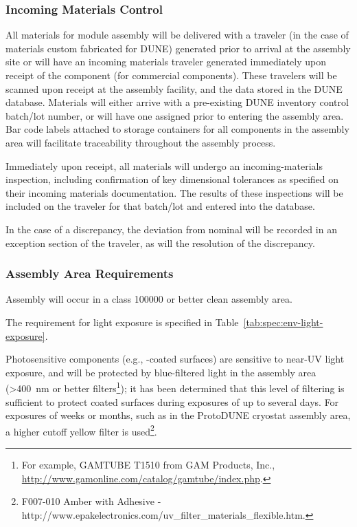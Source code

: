 \subsubsection{Incoming Materials Control}

All materials for  module assembly will be delivered with a  traveler (in the case of materials custom fabricated for DUNE) generated prior to arrival at the assembly site or will have an incoming materials traveler generated immediately upon receipt of the component (for commercial components).  These travelers will be scanned upon receipt at the assembly facility, and the data stored in the DUNE  database.  Materials will either arrive with a pre-existing DUNE inventory control batch/lot number, or will have one assigned prior to entering the assembly area.  Bar code labels attached to storage containers for all components in the assembly area will facilitate traceability throughout the assembly process.

Immediately upon receipt, all materials will undergo an incoming-materials inspection, including confirmation of key dimensional tolerances as specified on their incoming materials documentation. %
The results of these inspections will be included on the traveler for that batch/lot and entered into the database.

In the case of a discrepancy, the deviation from nominal will be recorded in an exception section of the traveler, as will the resolution of the discrepancy.

\subsubsection{Assembly Area Requirements}

Assembly will occur in a class \num{100000} or better clean assembly area.  

The requirement for light exposure is specified in Table~\ref{tab:spec:env-light-exposure}.


Photosensitive components (e.g., -coated surfaces) are sensitive to near-UV light exposure, and will be protected by blue-filtered light in the assembly area (>\SI{400}{nm} or better filters\footnote{For example, GAMTUBE T1510\texttrademark{} from GAM Products, Inc., \url{http://www.gamonline.com/catalog/gamtube/index.php}.}); it has been determined that this level of filtering is sufficient to protect coated surfaces during  exposures of up to several days. For exposures of weeks or months, such as in the ProtoDUNE cryostat assembly area, a higher cutoff yellow filter is used\footnote{F007-010\texttrademark{} Amber with Adhesive - http://www.epakelectronics.com/uv\_filter\_materials\_flexible.htm.}. 


